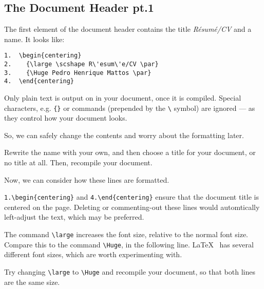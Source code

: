 \subsection{The Document Header pt.1}
The first element of the document header contains the title \emph{R\'esum\'e/CV} and a name. It looks like: \par

\begin{lstlisting}
1.  \begin{centering}
2.    {\large \scshape R\'esum\'e/CV \par}
3.    {\Huge Pedro Henrique Mattos \par}
4.  \end{centering}
\end{lstlisting}

Only plain text is output on in your document, once it is compiled. Special characters, e.g. \lstinline|{}| or commands (prepended by the \lstinline|\| symbol) are ignored --- as they control how your document looks. \par

So, we can safely change the contents and worry about the formatting later. \par

\begin{instrct}
Rewrite the  name with your own, and then choose a title for your document, or no title at all. Then, recompile your document.
\end{instrct}

Now, we can consider how these lines are formatted. \par

\lstinline|1.\begin{centering}| and \lstinline|4.\end{centering}| ensure that the document title is centered on the page. Deleting or commenting-out these lines would automtically left-adjust the text, which may be preferred. \par

The command \lstinline|\large| increases the font size, relative to the normal font size. Compare this to the command \lstinline|\Huge|, in the following line. \LaTeX ~ has several different font sizes, which are worth experimenting with. \par

\begin{ext}
Try changing \lstinline|\large| to \lstinline|\Huge| and recompile your document, so that both lines are the same size.
\end{ext}


